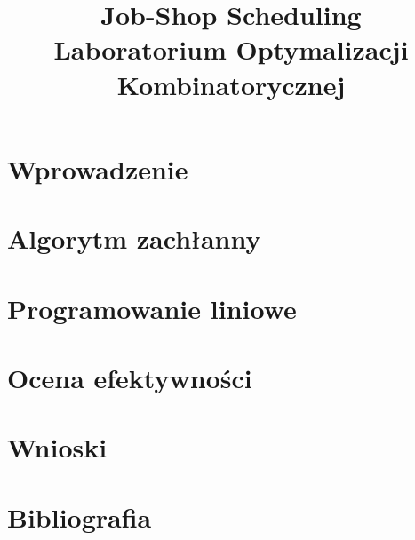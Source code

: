 \documentclass[10pt,a4paper]{article}
\author{\authorthing}
\title{Job-Shop Scheduling\\Laboratorium Optymalizacji Kombinatorycznej}
\begin{document}
\maketitle
\section{Wprowadzenie}
\section{Algorytm zachłanny}
\section{Programowanie liniowe}
\section{Ocena efektywności}
\section{Wnioski}
\section{Bibliografia}
\end{document}
